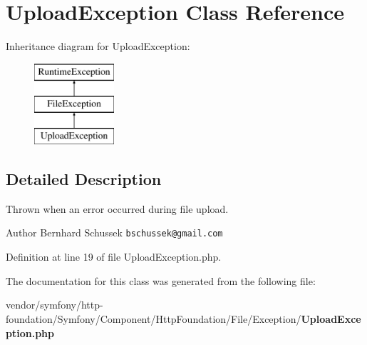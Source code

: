\section{Upload\+Exception Class Reference}
\label{class_symfony_1_1_component_1_1_http_foundation_1_1_file_1_1_exception_1_1_upload_exception}
Inheritance diagram for Upload\+Exception\+:\begin{figure}[H]
\begin{center}
\leavevmode
\includegraphics[height=3.000000cm]{class_symfony_1_1_component_1_1_http_foundation_1_1_file_1_1_exception_1_1_upload_exception}
\end{center}
\end{figure}


\subsection{Detailed Description}
Thrown when an error occurred during file upload.

\begin{DoxyAuthor}{Author}
Bernhard Schussek {\tt bschussek@gmail.\+com} 
\end{DoxyAuthor}


Definition at line 19 of file Upload\+Exception.\+php.



The documentation for this class was generated from the following file\+:\begin{DoxyCompactItemize}
\item 
vendor/symfony/http-\/foundation/\+Symfony/\+Component/\+Http\+Foundation/\+File/\+Exception/{\bf Upload\+Exception.\+php}\end{DoxyCompactItemize}
